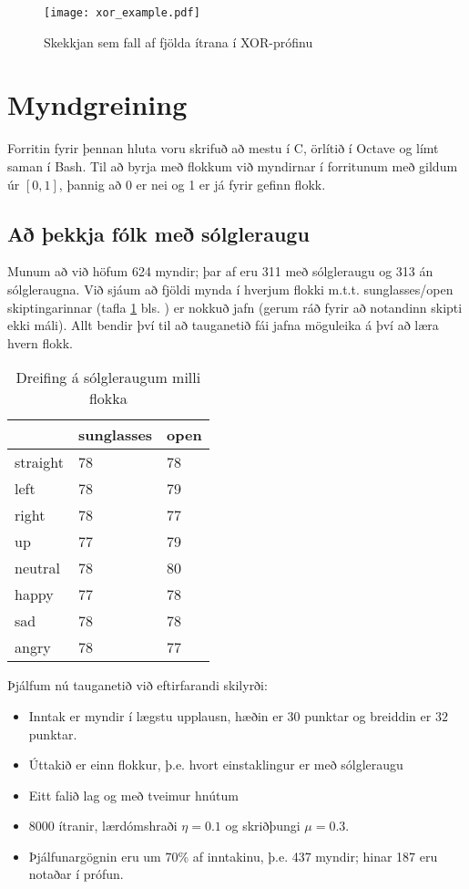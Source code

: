 \documentclass[a4paper,icelandic]{article}
\begin{document}
\begin{figure}[h]
  \begin{center}
    \texttt{[image: xor\_example.pdf]}
  \end{center}
  \caption{Skekkjan sem fall af fjölda ítrana í XOR-prófinu}
  \label{fig:xor-test}
\end{figure}


\section{Myndgreining}

Forritin fyrir þennan hluta voru skrifuð að mestu í C, örlítið í Octave
og límt saman í Bash. Til að byrja með flokkum við myndirnar í forritunum með
gildum úr $[0,1]$, þannig að 0 er nei og 1 er já fyrir gefinn flokk.

\subsection{Að þekkja fólk með sólgleraugu}

Munum að við höfum 624 myndir; þar af eru 311 með sólgleraugu og 313 án
sólgleraugna. Við sjáum að fjöldi mynda í hverjum flokki m.t.t.
sunglasses/open skiptingarinnar (tafla \ref{tab:sunglasses} bls.
\pageref{tab:sunglasses}) er nokkuð
jafn (gerum ráð fyrir að notandinn skipti ekki máli). Allt bendir því
til að tauganetið fái jafna möguleika á því að læra hvern flokk.

\begin{table}[h!]
  \centering
  \begin{tabular}{l|ll}
    & sunglasses & open \\\hline\hline
    straight & 78 & 78 \\
    left & 78 & 79 \\
    right & 78 & 77 \\
    up & 77 & 79 \\
    \hline
    neutral & 78 & 80 \\
    happy & 77 & 78 \\
    sad & 78 & 78 \\
    angry & 78 & 77 \\
  \end{tabular}
  \caption{Dreifing á sólgleraugum milli flokka}
  \label{tab:sunglasses}
\end{table}

Þjálfum nú tauganetið við eftirfarandi skilyrði:
\begin{itemize}
  \item Inntak er myndir í lægstu upplausn, hæðin er $30$ punktar og
    breiddin er $32$ punktar.
  \item Úttakið er einn flokkur, þ.e. hvort einstaklingur er með
    sólgleraugu
  \item Eitt falið lag og með tveimur hnútum
  \item 8000 ítranir, lærdómshraði $\eta = 0.1$ og skriðþungi
    $\mu=0.3$.
  \item Þjálfunargögnin eru um 70\% af inntakinu, þ.e. 437 myndir; hinar
    187 eru notaðar í prófun.
\end{itemize}
\end{document}
